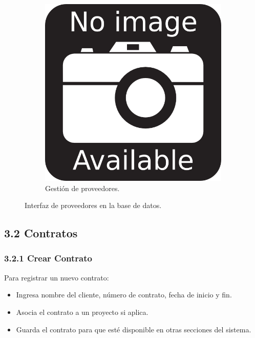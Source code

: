 \begin{figure}[h]
\centering
\begin{subfigure}{0.4\textwidth}
    \includegraphics[width=\textwidth]{imgs/no-image.png}
    \caption{Gestión de proveedores.}
    \label{fig:admin2}
\end{subfigure}
\caption{Interfaz de proveedores en la base de datos.}
\end{figure}

\subsection{3.2 Contratos}

\subsubsection{3.2.1 Crear Contrato}

Para registrar un nuevo contrato:

\begin{itemize}
    \item Ingresa nombre del cliente, número de contrato, fecha de inicio y fin.
    \item Asocia el contrato a un proyecto si aplica.
    \item Guarda el contrato para que esté disponible en otras secciones del sistema.
\end{itemize}

